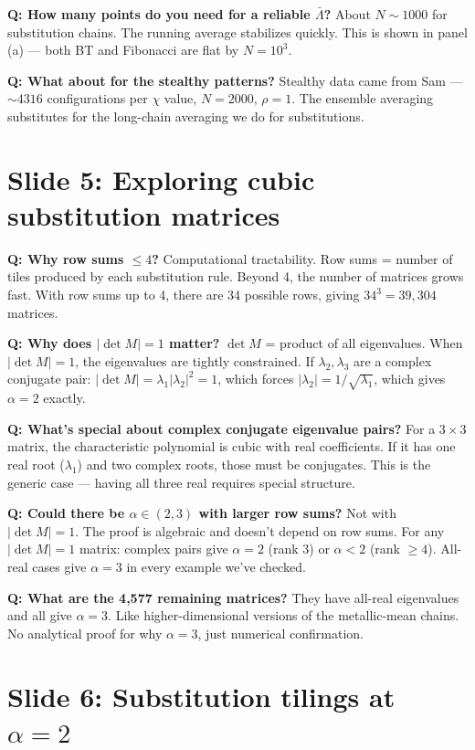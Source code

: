 \documentclass[11pt]{article}
\newcommand{\Q}[1]{\textcolor{qcolor}{\textbf{Q: #1}}}
\begin{document}
\Q{How many points do you need for a reliable $\bar\Lambda$?}
About $N \sim 1000$ for substitution chains. The running average stabilizes quickly. This is shown in panel (a) --- both BT and Fibonacci are flat by $N = 10^3$.

\Q{What about for the stealthy patterns?}
Stealthy data came from Sam --- ${\sim}4316$ configurations per $\chi$ value, $N=2000$, $\rho=1$. The ensemble averaging substitutes for the long-chain averaging we do for substitutions.

\section{Slide 5: Exploring cubic substitution matrices}

\Q{Why row sums $\leq 4$?}
Computational tractability. Row sums = number of tiles produced by each substitution rule. Beyond 4, the number of matrices grows fast. With row sums up to 4, there are 34 possible rows, giving $34^3 = 39{,}304$ matrices.

\Q{Why does $|\det M|=1$ matter?}
$\det M$ = product of all eigenvalues. When $|\det M|=1$, the eigenvalues are tightly constrained. If $\lambda_2, \lambda_3$ are a complex conjugate pair: $|\det M| = \lambda_1|\lambda_2|^2 = 1$, which forces $|\lambda_2| = 1/\sqrt{\lambda_1}$, which gives $\alpha = 2$ exactly.

\Q{What's special about complex conjugate eigenvalue pairs?}
For a $3\times3$ matrix, the characteristic polynomial is cubic with real coefficients. If it has one real root ($\lambda_1$) and two complex roots, those must be conjugates. This is the generic case --- having all three real requires special structure.

\Q{Could there be $\alpha\in(2,3)$ with larger row sums?}
Not with $|\det M|=1$. The proof is algebraic and doesn't depend on row sums. For any $|\det M|=1$ matrix: complex pairs give $\alpha=2$ (rank 3) or $\alpha<2$ (rank $\geq4$). All-real cases give $\alpha=3$ in every example we've checked.

\Q{What are the 4,577 remaining matrices?}
They have all-real eigenvalues and all give $\alpha=3$. Like higher-dimensional versions of the metallic-mean chains. No analytical proof for why $\alpha=3$, just numerical confirmation.

\section{Slide 6: Substitution tilings at $\alpha=2$}
\end{document}
